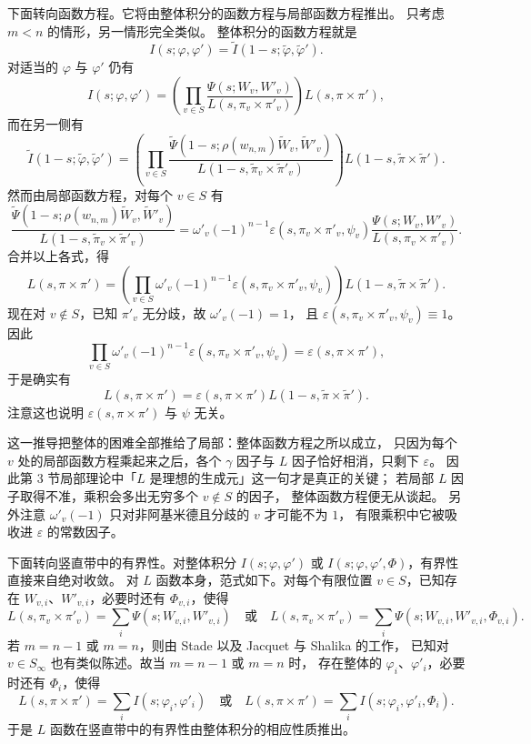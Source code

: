 下面转向函数方程。它将由整体积分的函数方程与局部函数方程推出。
只考虑 $m<n$ 的情形，另一情形完全类似。
整体积分的函数方程就是
\[
I(s;\varphi,\varphi')=\widetilde{I}(1-s;\widetilde{\varphi},\widetilde{\varphi}').
\]
对适当的 $\varphi$ 与 $\varphi'$ 仍有
\[
I(s;\varphi,\varphi')=\left(\prod_{v\in S}
\frac{\Psi(s;W_v,W'_v)}{L(s,\pi_v\times\pi'_v)}\right)L(s,\pi\times\pi'),
\]
而在另一侧有
\[
\widetilde{I}(1-s;\widetilde{\varphi},\widetilde{\varphi}')
=\left(\prod_{v\in S}
\frac{\widetilde{\Psi}(1-s;\rho(w_{n,m})\widetilde{W}_v,\widetilde{W}'_v)}
{L(1-s,\widetilde{\pi}_v\times\widetilde{\pi}'_v)}\right)
L(1-s,\widetilde{\pi}\times\widetilde{\pi}').
\]
然而由局部函数方程，对每个 $v\in S$ 有
\[
\frac{\widetilde{\Psi}(1-s;\rho(w_{n,m})\widetilde{W}_v,\widetilde{W}'_v)}
{L(1-s,\widetilde{\pi}_v\times\widetilde{\pi}'_v)}
=\omega'_v(-1)^{n-1}\varepsilon(s,\pi_v\times\pi'_v,\psi_v)
\frac{\Psi(s;W_v,W'_v)}{L(s,\pi_v\times\pi'_v)}.
\]
合并以上各式，得
\[
L(s,\pi\times\pi')=\left(\prod_{v\in S}\omega'_v(-1)^{n-1}
\varepsilon(s,\pi_v\times\pi'_v,\psi_v)\right)
L(1-s,\widetilde{\pi}\times\widetilde{\pi}').
\]
现在对 $v\notin S$，已知 $\pi'_v$ 无分歧，故 $\omega'_v(-1)=1$，
且 $\varepsilon(s,\pi_v\times\pi'_v,\psi_v)\equiv1$。因此
\[
\prod_{v\in S}\omega'_v(-1)^{n-1}\varepsilon(s,\pi_v\times\pi'_v,\psi_v)
=\varepsilon(s,\pi\times\pi'),
\]
于是确实有
\[
L(s,\pi\times\pi')=\varepsilon(s,\pi\times\pi')
L(1-s,\widetilde{\pi}\times\widetilde{\pi}').
\]
注意这也说明 $\varepsilon(s,\pi\times\pi')$ 与 $\psi$ 无关。
\begin{annote}
这一推导把整体的困难全部推给了局部：整体函数方程之所以成立，
只因为每个 $v$ 处的局部函数方程乘起来之后，各个 $\gamma$ 因子与
$L$ 因子恰好相消，只剩下 $\varepsilon$。
因此第 3 节局部理论中「$L$ 是理想的生成元」这一句才是真正的关键；
若局部 $L$ 因子取得不准，乘积会多出无穷多个 $v\notin S$ 的因子，
整体函数方程便无从谈起。
另外注意 $\omega'_v(-1)$ 只对非阿基米德且分歧的 $v$ 才可能不为 $1$，
有限乘积中它被吸收进 $\varepsilon$ 的常数因子。
\par\vspace{0.15em}{\raggedleft 【来源：Jacquet--Shalika, Amer.\ J.\ Math.\ 103 (1981), 499--588；Cogdell, ICTP Lecture Notes, §4（A）】\par}
\end{annote}

下面转向竖直带中的有界性。对整体积分 $I(s;\varphi,\varphi')$ 或
$I(s;\varphi,\varphi',\Phi)$，有界性直接来自绝对收敛。
对 $L$ 函数本身，范式如下。对每个有限位置 $v\in S$，已知存在
$W_{v,i}$、$W'_{v,i}$，必要时还有 $\Phi_{v,i}$，使得
\[
L(s,\pi_v\times\pi'_v)=\sum_i\Psi(s;W_{v,i},W'_{v,i})
\quad\text{或}\quad
L(s,\pi_v\times\pi'_v)=\sum_i\Psi(s;W_{v,i},W'_{v,i},\Phi_{v,i}).
\]
若 $m=n-1$ 或 $m=n$，则由 Stade 以及 Jacquet 与 Shalika 的工作，
已知对 $v\in S_\infty$ 也有类似陈述。故当 $m=n-1$ 或 $m=n$ 时，
存在整体的 $\varphi_i$、$\varphi'_i$，必要时还有 $\Phi_i$，使得
\[
L(s,\pi\times\pi')=\sum_iI(s;\varphi_i,\varphi'_i)
\quad\text{或}\quad
L(s,\pi\times\pi')=\sum_iI(s;\varphi_i,\varphi'_i,\Phi_i).
\]
于是 $L$ 函数在竖直带中的有界性由整体积分的相应性质推出。

